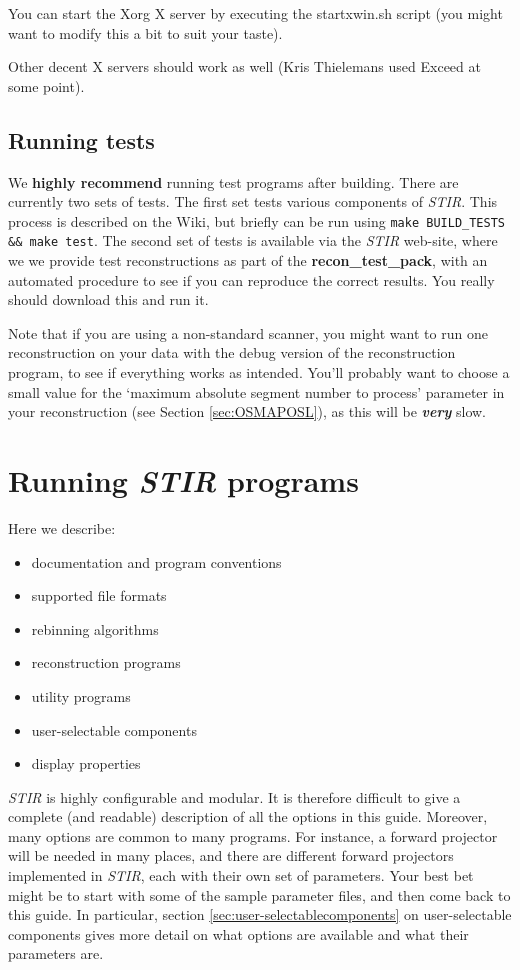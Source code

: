\documentclass{article}
\begin{document}
You can start the Xorg X server by executing the startxwin.sh 
script (you might want to modify this a bit to suit your taste). 

Other decent X servers should work as well (Kris Thielemans used Exceed at 
some point).


\subsection{
Running tests}

We \textbf{highly recommend} running test programs after building. There are currently two
sets of tests. The first set tests various components of
\textit{STIR}. This process is described on the Wiki, but briefly can
be run using \texttt{make BUILD_TESTS && make test}.
The second set of tests is available via the \textit{STIR} web-site, where we 
we provide test reconstructions as part of the
\textbf{recon\_test\_pack}, with an 
automated procedure to see if you can reproduce the correct results. 
You really should download this and run it.


Note that if you are using a non-standard scanner, 
you might want to run one reconstruction on your data with 
the debug version of the reconstruction program, to see if everything 
works as intended. You'll probably want to choose a small value 
for the `maximum absolute segment number to process' parameter 
in your reconstruction (see Section \ref{sec:OSMAPOSL}), as this will be \textbf{\textit{very}} 
slow.




\section{
Running \textit{STIR} programs}

Here we describe:
\begin{itemize}
\item documentation and program conventions
\item supported file formats 
\item rebinning algorithms
\item reconstruction programs
\item utility programs
\item user-selectable components
\item display properties
\end{itemize}

\textit{STIR} is highly configurable and modular. It is therefore difficult to give a complete (and readable)
description of all the options in this guide. Moreover, many options are common to many
programs. For instance, a forward projector will be needed in many places, and there are 
different forward projectors implemented in \textit{STIR}, each with their own set of 
parameters. Your best bet might be to start with some of the sample parameter files, and then
come back to this guide. In particular, section \ref{sec:user-selectablecomponents}
on user-selectable components gives more detail on what options are available
and what their parameters are.
\end{document}
